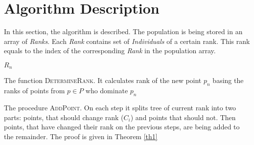 \documentclass{article}
\begin{document}
\section{Algorithm Description}\label{sec-algo}
In this section, the algorithm is described.
The population is being stored in an array of \textit{Ranks}.
Each \textit{Rank} contains set of \textit{Individuals} of a certain rank. 
This rank equals to the index of the corresponding \textit{Rank} in the
population array.

\begin{algorithm}[H]
\begin{algorithmic}[1]
	    \EndIf
	\EndFor
	\State\Return $R_n$
\EndFunction
\end{algorithmic}
\caption{The function \textsc{DetermineRank}. It calculates rank of the new
point $p_n$ basing the ranks of points from $p \in P$ who dominate $p_n$}
\label{DetermineRank}
\end{algorithm}

\begin{algorithm}[H]
\begin{algorithmic}[1]
	 \Return
    \Else
        \EndWhile
    \EndIf
\EndProcedure
\end{algorithmic}
\caption{The procedure \textsc{AddPoint}. On each step it splits tree of
current rank into two parts: points, that should change rank ($C_i$) and points
that should not. Then points, that have changed their rank on the previous steps,
are being added to the remainder. The proof is given in Theorem \ref{th1}}
\label{AddPoint}
\end{algorithm}
\end{document}
